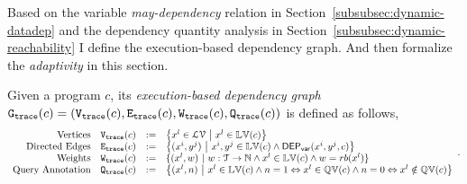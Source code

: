 
Based on the variable \emph{may-dependency} relation in Section~\ref{subsubsec:dynamic-datadep} and 
the dependency quantity analysis in Section~\ref{subsubsec:dynamic-reachability}
I define the execution-based dependency graph. And then formalize the \emph{adaptivity} in this section.
\begin{defn}
\label{def:trace_graph}
Given a program ${c}$,
its \emph{execution-based dependency graph} 
$\mathtt{{G_{trace}}}({c}) = (\mathtt{{V_{trace}}}({c}), \mathtt{{E_{trace}}}({c}), \mathtt{{W_{trace}}}({c}), \mathtt{{Q_{trace}}}({c}))$ is defined as follows,
%
{\small
\[
\begin{array}{rlcl}
  \text{Vertices} &
  \traceV({c}) & := & \left\{ 
  x^l \in \mathcal{LV}
  ~ \middle\vert ~ x^l \in \lvar(c)
  \right\}
  \\
  \text{Directed Edges} &
  \traceE({c}) & := & 
  \left\{ 
  (x^i, y^j) 
  ~ \middle\vert ~
  x^i, y^j \in \lvar(c) \land \vardep(x^i, y^j, c) 
  \right\}
  \\
  \text{Weights} &
  \traceW({c}) & := & 
  \{ 
  (x^l, w) 
  ~ \vert ~ 
  w : \mathcal{T} \to \mathbb{N}
  \land
  x^l \in \lvar(c) 
  \land w = rb(x^l)
\}
  \\
  \text{Query Annotation} &
  \traceF({c}) & := & 
\left\{(x^l, n)  
~ \middle\vert ~
 x^l \in \lvar(c) \land
n = 1 \Leftrightarrow x^l \in \qvar(c) \land n = 0 \Leftrightarrow  x^l \notin \qvar(c)
\right\}
\end{array}.
\]
}
\end{defn}
